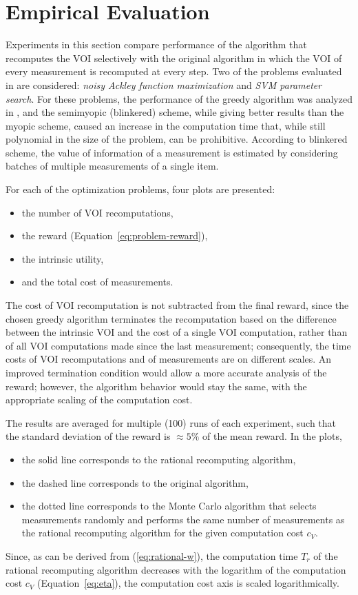 \section{ Empirical Evaluation}
\label{sec:raticomp-empirical}

Experiments in this section compare performance of the algorithm that recomputes the VOI
selectively with the original algorithm in which the VOI
of every measurement is recomputed at every step.
Two of the problems evaluated in \cite{TolpinShimony.blinkered} are 
considered: {\it noisy Ackley function maximization} and {\it SVM parameter search}.
For these problems, the
performance of the greedy algorithm was analyzed in
\cite{TolpinShimony.blinkered}, and the semimyopic (blinkered) scheme, while
giving better results than the myopic scheme, caused an increase in
the computation time that, while still polynomial in the size of the
problem, can be prohibitive. According to blinkered scheme, the value
of information of a measurement is estimated by considering batches of
multiple measurements of a single item.

For each of the optimization problems, four plots are presented:
\begin{itemize}
\item the number of VOI recomputations,
\item the reward (Equation~\ref{eq:problem-reward}),
\item the intrinsic utility,
\item and the total cost of measurements.
\end{itemize}
The cost of VOI recomputation is not
subtracted from the final reward, since the chosen greedy algorithm
terminates the recomputation based on the difference between the
intrinsic VOI and the  cost of a single VOI computation, rather than of
all VOI computations made since the last measurement; consequently,
the time costs of VOI recomputations and of measurements are on
different scales. An improved termination condition would allow a
more accurate analysis of the reward; however, the algorithm behavior would
stay the same, with the appropriate scaling of the computation cost.

The results are averaged for multiple
(100) runs of each experiment, such that the standard deviation of the
reward is $\approx 5\%$ of the mean reward. In the plots, 
\begin{itemize}
\item the solid line corresponds to the rational recomputing
  algorithm,
\item the dashed line corresponds to the original algorithm,
\item the dotted line corresponds to the Monte Carlo algorithm that selects
  measurements randomly and performs the 
same number of measurements as the rational recomputing algorithm
for the given computation cost $c_V$.
\end{itemize}
Since, as can be derived from
(\ref{eq:rational-w}), the computation time $T_r$ of the rational
recomputing algorithm decreases with the logarithm of the computation
cost $c_V$ (Equation~\ref{eq:eta}), the computation cost axis is
scaled logarithmically.

